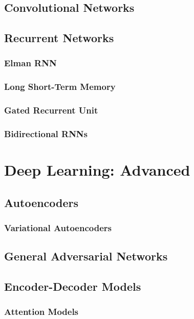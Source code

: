\documentclass[twoside,twocolumn]{article}
\begin{document}
\subsection{Convolutional Networks}
\subsection{Recurrent Networks}
\subsubsection{Elman RNN}
\subsubsection{Long Short-Term Memory}
\subsubsection{Gated Recurrent Unit}
\subsubsection{Bidirectional RNNs}
\section{Deep Learning: Advanced}
\subsection{Autoencoders}
\subsubsection{Variational Autoencoders}
\subsection{General Adversarial Networks}
\subsection{Encoder-Decoder Models}
\subsubsection{Attention Models}



% 
% 

\end{document}
